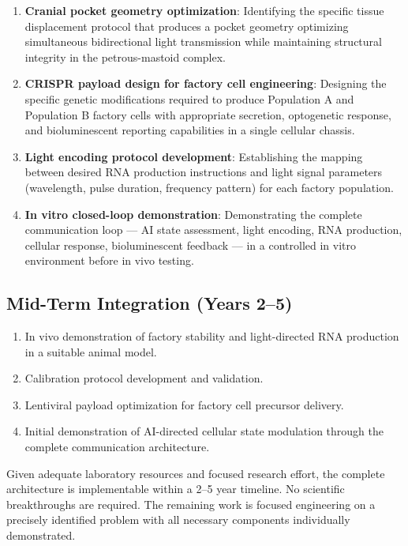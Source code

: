 \documentclass[12pt]{article}
\begin{document}
\begin{enumerate}
    \item \textbf{Cranial pocket geometry optimization}: Identifying the specific tissue displacement protocol that produces a pocket geometry optimizing simultaneous bidirectional light transmission while maintaining structural integrity in the petrous-mastoid complex.

    \item \textbf{CRISPR payload design for factory cell engineering}: Designing the specific genetic modifications required to produce Population A and Population B factory cells with appropriate secretion, optogenetic response, and bioluminescent reporting capabilities in a single cellular chassis.

    \item \textbf{Light encoding protocol development}: Establishing the mapping between desired RNA production instructions and light signal parameters (wavelength, pulse duration, frequency pattern) for each factory population.

    \item \textbf{In vitro closed-loop demonstration}: Demonstrating the complete communication loop --- AI state assessment, light encoding, RNA production, cellular response, bioluminescent feedback --- in a controlled in vitro environment before in vivo testing.
\end{enumerate}

\subsection{Mid-Term Integration (Years 2--5)}

\begin{enumerate}
    \item In vivo demonstration of factory stability and light-directed RNA production in a suitable animal model.
    \item Calibration protocol development and validation.
    \item Lentiviral payload optimization for factory cell precursor delivery.
    \item Initial demonstration of AI-directed cellular state modulation through the complete communication architecture.
\end{enumerate}

Given adequate laboratory resources and focused research effort, the complete architecture is implementable within a 2--5 year timeline. No scientific breakthroughs are required. The remaining work is focused engineering on a precisely identified problem with all necessary components individually demonstrated.
\end{document}
